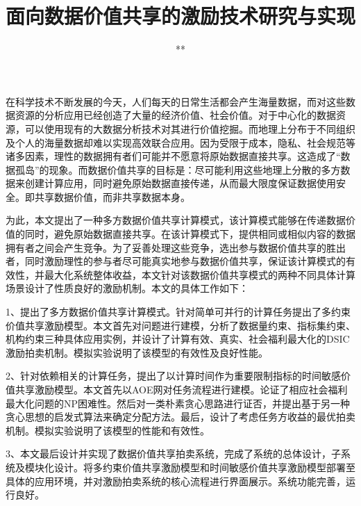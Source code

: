 \documentclass[promaster]{thesis-uestc}
\title{面向数据价值共享的激励技术研究与实现}{The Study and Implementation of Incentive Techniques for Value-based Data Sharing}
\author{**}{**}
\begin{document}
\makecover

\originalitydeclaration

\begin{chineseabstract}

在科学技术不断发展的今天，人们每天的日常生活都会产生海量数据，而对这些数据资源的分析应用已经创造了大量的经济价值、社会价值。对于中心化的数据资源，可以使用现有的大数据分析技术对其进行价值挖掘。而地理上分布于不同组织及个人的海量数据却难以实现高效联合应用。因为受限于成本，隐私、社会规范等诸多因素，理性的数据拥有者们可能并不愿意将原始数据直接共享。这造成了“数据孤岛”的现象。而数据价值共享的目标是：尽可能利用这些地理上分散的多方数据来创建计算应用，同时避免原始数据直接传递，从而最大限度保证数据使用安全。即共享数据价值，而非共享数据本身。

为此，本文提出了一种多方数据价值共享计算模式，该计算模式能够在传递数据价值的同时，避免原始数据直接共享。在该计算模式下，提供相同或相似内容的数据拥有者之间会产生竞争。为了妥善处理这些竞争，选出参与数据价值共享的胜出者，同时激励理性的参与者尽可能真实地参与数据价值共享，保证该计算模式的有效性，并最大化系统整体收益，本文针对该数据价值共享模式的两种不同具体计算场景设计了性质良好的激励机制。本文的具体工作如下：

1、提出了多方数据价值共享计算模式。针对简单可并行的计算任务提出了多约束价值共享激励模型。本文首先对问题进行建模，分析了数据量约束、指标集约束、机构约束三种具体应用实例，并设计了计算有效、真实、社会福利最大化的DSIC激励拍卖机制。模拟实验说明了该模型的有效性及良好性能。

2、针对依赖相关的计算任务，提出了以计算时间作为重要限制指标的时间敏感价值共享激励模型。本文首先以AOE网对任务流程进行建模。论证了相应社会福利最大化问题的NP困难性。然后对一类朴素贪心思路进行证否，并提出基于另一种贪心思想的启发式算法来确定分配方法。最后，设计了考虑任务方收益的最优拍卖机制。模拟实验说明了该模型的性能和有效性。

3、本文最后设计并实现了数据价值共享拍卖系统，完成了系统的总体设计，子系统及模块化设计。将多约束价值共享激励模型和时间敏感价值共享激励模型部署至具体的应用环境，并对激励拍卖系统的核心流程进行界面展示。系统功能完善，运行良好。


\end{chineseabstract}
\end{document}
